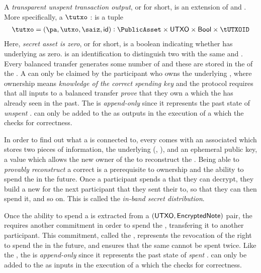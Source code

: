 A \emph{transparent unspent transaction output}, or \TUTXO{} for short, is an extension of \PublicAsset{} and \UTXO{}. More specifically, a 
$\tutxo$ : \TUTXO{} is a tuple 
\begin{align*}
    \tutxo = (\pa, \utxo, \saiz, \ID) : \PublicAsset \times \UTXO \times \Bool \times \tUTXOID
\end{align*}
Here, \emph{secret asset is zero}, or \saiz{} for short, is a boolean indicating whether \utxo{} has underlying \AssetValue{}
as zero. 
\tUTXOID{} is an identification to distinguish two  with the same \PublicAsset{} and \UTXO{}.
Every balanced transfer generates some number of  and these  are stored in the \TUTXOSet{} 
of the \ShieldedAssetPool{}. A \TUTXO{} can only be claimed by the participant who owns the underlying \SecretAsset{}, where ownership means 
\emph{knowledge of the correct spending key} and the \Transfer{} protocol requires that all inputs to a balanced transfer \emph{prove} 
that they own a \TUTXO{} which the \ShieldedAssetPool{} has already seen in the past.
The \TUTXOSet{} is \emph{append-only} since it represents the past state of \emph{unspent} .  can only be added to the 
\TUTXOSet{} as outputs in the execution of a \Transfer{} which the \Ledger{} checks for correctness.


In order to find out what \SecretAsset{} a \UTXO{} is connected to, every \UTXO{} comes with an associated \EncryptedNote{} which stores two pieces of information, the underlying (\AssetId{}, \AssetValue{}), and an ephemeral public key, a value which allows the new owner of the \SecretAsset{} to reconstruct the \UTXO{}. Being able to \emph{provably reconstruct} a correct \UTXO{} is a prerequisite to ownership and the ability to spend the \SecretAsset{} in the future. Once a participant spends a \SecretAsset{} that they can decrypt, they build a new \EncryptedNote{} for the next participant that they sent their  to, so that they can then spend it, and so on. This is called the \emph{in-band secret distribution}.


Once the ability to spend a \SecretAsset{} is extracted from a $({\textsf{UTXO}}, {\textsf{EncryptedNote}})$ pair, the \ShieldedAssetPool{} requires another commitment in order to spend the \SecretAsset{}, transfering it to another participant. This commitment, called the \VoidNumber{}, represents the revocation of the right to spend the \SecretAsset{} in the future, and ensures that the same \SecretAsset{} cannot be spent twice. Like the \TUTXOSet{}, the \VoidNumberSet{} is \emph{append-only} since it represents the past state of \emph{spent} .  can only be added to the \VoidNumberSet{} as inputs in the execution of a \Transfer{} which the \Ledger{} checks for correctness.
